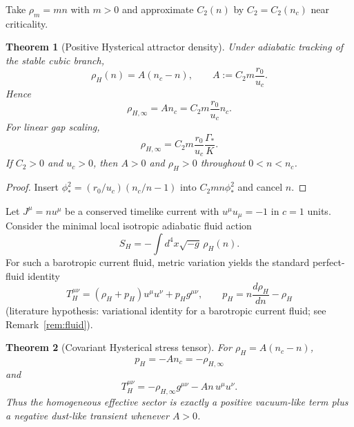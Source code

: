 \documentclass[11pt]{article}
\newtheorem{theorem}{Theorem}[section]
\theoremstyle{definition}
\theoremstyle{remark}
\begin{document}
Take $\rho_m=mn$ with $m>0$ and approximate $C_2(n)$ by $C_2=C_2(n_c)$ near criticality.

\begin{theorem}[Positive Hysterical attractor density]
\label{thm:positive-attractor}
Under adiabatic tracking of the stable cubic branch,
\begin{equation}
\label{eq:rhoH-n}
\boxed{\rho_H(n)=A(n_c-n),\qquad A:=C_2 m\frac{r_0}{u_c}.}
\end{equation}
Hence
\begin{equation}
\boxed{\rho_{H,\infty}=A n_c=C_2 m\frac{r_0}{u_c}n_c.}
\end{equation}
For linear gap scaling,
\begin{equation}
\boxed{\rho_{H,\infty}=C_2 m\frac{r_0}{u_c}\frac{\Gamma_*}{K}.}
\end{equation}
If $C_2>0$ and $u_c>0$, then $A>0$ and $\rho_H>0$ throughout $0<n<n_c$.
\end{theorem}

\begin{proof}
Insert $\phi_*^2=(r_0/u_c)(n_c/n-1)$ into $C_2 m n\phi_*^2$ and cancel $n$.
\end{proof}

Let $J^\mu=n u^\mu$ be a conserved timelike current with $u^\mu u_\mu=-1$ in $c=1$ units.
Consider the minimal local isotropic adiabatic fluid action
\begin{equation}
\label{eq:action}
\boxed{S_H=-\int d^4x\sqrt{-g}\,\rho_H(n).}
\end{equation}
For such a barotropic current fluid, metric variation yields the standard perfect-fluid identity
\begin{equation}
\label{eq:perfect-fluid}
T_H^{\mu\nu}=(\rho_H+p_H)u^\mu u^\nu+p_H g^{\mu\nu},
\qquad
p_H=n\frac{d\rho_H}{dn}-\rho_H
\end{equation}
(literature hypothesis: variational identity for a barotropic current fluid; see Remark~\ref{rem:fluid}).

\begin{theorem}[Covariant Hysterical stress tensor]
\label{thm:stress}
For $\rho_H=A(n_c-n)$,
\begin{equation}
\boxed{p_H=-A n_c=-\rho_{H,\infty}}
\end{equation}
and
\begin{equation}
\boxed{T_H^{\mu\nu}=-\rho_{H,\infty}g^{\mu\nu}-A n\,u^\mu u^\nu.}
\end{equation}
Thus the homogeneous effective sector is exactly a positive vacuum-like term plus a negative dust-like transient whenever $A>0$.
\end{theorem}
\end{document}
